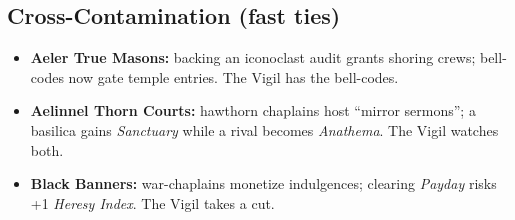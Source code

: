 \subsection*{Cross-Contamination (fast ties)}
\begin{itemize}
  \item \textbf{Aeler True Masons:} backing an iconoclast audit grants shoring crews; bell-codes now gate temple entries. The Vigil has the bell-codes.
  \item \textbf{Aelinnel Thorn Courts:} hawthorn chaplains host ``mirror sermons''; a basilica gains \emph{Sanctuary} while a rival becomes \emph{Anathema}. The Vigil watches both.
  \item \textbf{Black Banners:} war-chaplains monetize indulgences; clearing \emph{Payday} risks +1 \emph{Heresy Index}. The Vigil takes a cut.
\end{itemize}

